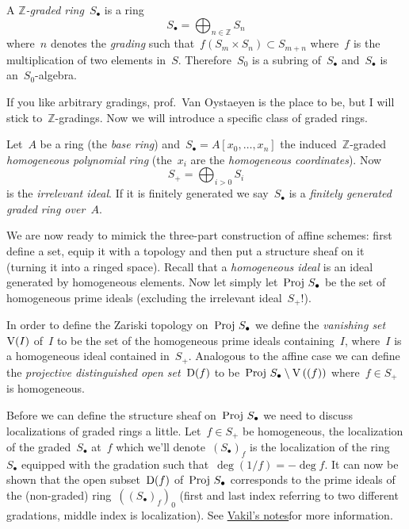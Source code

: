 \begin{definition}
  A \emph{$\mathbb{Z}$-graded ring}~$S_\bullet$ is a ring
  \begin{equation}
    S_\bullet=\bigoplus_{n\in\mathbb{Z}}S_n
  \end{equation}
  where~$n$ denotes the \emph{grading} such that~$f(S_m\times S_n)\subset S_{m+n}$ where~$f$ is the multiplication of two elements in~$S$. Therefore~$S_0$ is a subring of~$S_\bullet$ and~$S_\bullet$ is an~$S_0$\nobreakdash-algebra.
\end{definition}

If you like arbitrary gradings, prof.\ Van Oystaeyen is the place to be, but I will stick to~$\mathbb{Z}$\nobreakdash-gradings. Now we will introduce a specific class of graded rings.

\begin{example}
  Let~$A$ be a ring (the \emph{base ring}) and~$S_\bullet=A[x_0,\ldots,x_n]$ the induced~$\mathbb{Z}$-graded \emph{homogeneous polynomial ring} (the~$x_i$ are the \emph{homogeneous coordinates}). Now
  \begin{equation}
    S_+=\bigoplus_{i>0}S_i
  \end{equation}
  is the \emph{irrelevant ideal}. If it is finitely generated we say~$S_\bullet$ is a \emph{finitely generated graded ring over~$A$}.
\end{example}

We are now ready to mimick the three-part construction of affine schemes: first define a set, equip it with a topology and then put a structure sheaf on it (turning it into a ringed space). Recall that a \emph{homogeneous ideal} is an ideal generated by homogeneous elements. Now let simply let~$\operatorname{Proj\,} S_\bullet$ be the set of homogeneous prime ideals (excluding the irrelevant ideal~$S_+$!).

In order to define the Zariski topology on~$\operatorname{Proj\,} S_\bullet$ we define the \emph{vanishing set~$\operatorname{V}(I)$} of~$I$ to be the set of the homogeneous prime ideals containing~$I$, where~$I$ is a homogeneous ideal contained in~$S_+$. Analogous to the affine case we can define the \emph{projective distinguished open set}~$\operatorname{D}(f)$ to be~$\operatorname{Proj\,} S_\bullet\setminus\operatorname{V}\left( (f) \right)$ where~$f\in S_+$ is homogeneous.

Before we can define the structure sheaf on~$\operatorname{Proj\,} S_\bullet$ we need to discuss localizations of graded rings a little. Let~$f\in S_+$ be homogeneous, the localization of the graded~$S_\bullet$ at~$f$ which we'll denote~$(S_\bullet)_f$ is the localization of the ring~$S_\bullet$ equipped with the gradation such that~$\deg(1/f)=-\deg f$. It can now be shown that the open subset~$\operatorname{D}(f)$ of~$\operatorname{Proj\,} S_\bullet$ corresponds to the prime ideals of the (non-graded) ring~$\left( (S_\bullet)_f \right)_0$ (first and last index referring to two different gradations, middle index is localization). See \iftex\cite{foag}\fi\ifblog\href{http://math216.wordpress.com}{Vakil's notes}\fi for more information.

